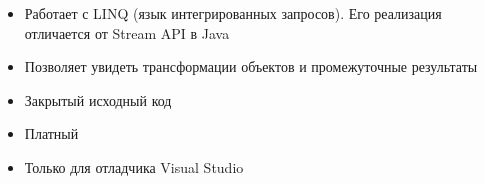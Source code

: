 \begin{frame}
\frametitle{\insertsection} 
\framesubtitle{\insertsubsection}
\begin{itemize}
	\item Работает с LINQ (язык интегрированных запросов). Его реализация отличается от Stream API в Java
	\item Позволяет увидеть трансформации объектов и промежуточные результаты
	\item Закрытый исходный код
	\item Платный
	\item Только для отладчика Visual Studio
\end{itemize}
\end{frame}

